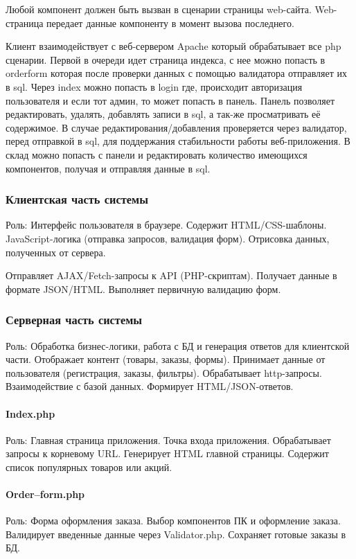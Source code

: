 Любой компонент должен быть вызван в сценарии страницы web-сайта. Web-страница передает данные компоненту в момент вызова последнего.

Клиент взаимодействует с веб-сервером Apache который обрабатывает все php сценарии. Первой в очереди идет страница индекса, с нее можно попасть в orderform которая после проверки данных с помощью валидатора отправляет их в sql. Через index можно попасть в login где, происходит авторизация пользователя и если тот админ, то может попасть в панель. Панель позволяет редактировать, удалять, добавлять записи в sql, а так-же просматривать её содержимое. В случае редактирования/добавления проверяется через валидатор, перед отправкой в sql, для поддержания стабильности работы веб-приложения. В склад можно попасть с панели и редактировать количество имеющихся компонентов, получая и отправляя данные в sql.
\newpage

\subsubsection{Клиентская часть системы}
Роль: Интерфейс пользователя в браузере.
Содержит HTML/CSS-шаблоны.
JavaScript-логика (отправка запросов, валидация форм).
Отрисовка данных, полученных от сервера.

Отправляет AJAX/Fetch-запросы к API (PHP-скриптам).
Получает данные в формате JSON/HTML.
Выполняет первичную валидацию форм.

\subsubsection{Серверная часть системы}
Роль: Обработка бизнес-логики, работа с БД и генерация ответов для клиентской части.
Отображает контент (товары, заказы, формы).
Принимает данные от пользователя (регистрация, заказы, фильтры).
Обрабатывает http-запросы.
Взаимодействие с базой данных.
Формирует HTML/JSON-ответов.

\paragraph{Index.php} 
Роль: Главная страница приложения.
Точка входа приложения. Обрабатывает запросы к корневому URL.
Генерирует HTML главной страницы.
Содержит список популярных товаров или акций.

\paragraph{Order--form.php} 
Роль: Форма оформления заказа.
Выбор компонентов ПК и оформление заказа.
Валидирует введенные данные через Validator.php.
Сохраняет готовые заказы в БД.

